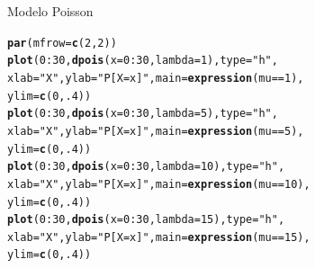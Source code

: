 \documentclass[10pt]{beamer}\usepackage[]{graphicx}\usepackage[]{color}
\makeatletter
\newcommand{\hlnum}[1]{\textcolor[rgb]{0.686,0.059,0.569}{#1}}%
\newcommand{\hlstr}[1]{\textcolor[rgb]{0.192,0.494,0.8}{#1}}%
\newcommand{\hlopt}[1]{\textcolor[rgb]{0,0,0}{#1}}%
\newcommand{\hlstd}[1]{\textcolor[rgb]{0.345,0.345,0.345}{#1}}%
\newcommand{\hlkwc}[1]{\textcolor[rgb]{0.333,0.667,0.333}{#1}}%
\newcommand{\hlkwd}[1]{\textcolor[rgb]{0.737,0.353,0.396}{\textbf{#1}}}%
\newenvironment{kframe}{%
 \def\at@end@of@kframe{}%
 \ifinner\ifhmode%
  \def\at@end@of@kframe{\end{minipage}}%
  \begin{minipage}{\columnwidth}%
 \fi\fi%
 \def\FrameCommand##1{\hskip\@totalleftmargin \hskip-\fboxsep
 \colorbox{shadecolor}{##1}\hskip-\fboxsep
     \hskip-\linewidth \hskip-\@totalleftmargin \hskip\columnwidth}%
 \MakeFramed {\advance\hsize-\width
   \@totalleftmargin\z@ \linewidth\hsize
   \@setminipage}}%
 {\par\unskip\endMakeFramed%
 \at@end@of@kframe}
\newenvironment{knitrout}{}{} %
\theoremstyle{definition}
\makeatother
\begin{document}
\begin{frame}[fragile]{Modelo Poisson}
\begin{knitrout}\small
{}\color{fgcolor}\begin{kframe}
\begin{alltt}
\hlkwd{par}\hlstd{(}\hlkwc{mfrow}\hlstd{=}\hlkwd{c}\hlstd{(}\hlnum{2}\hlstd{,}\hlnum{2}\hlstd{))}
\hlkwd{plot}\hlstd{(}\hlnum{0}\hlopt{:}\hlnum{30}\hlstd{,} \hlkwd{dpois}\hlstd{(}\hlkwc{x} \hlstd{=} \hlnum{0}\hlopt{:}\hlnum{30}\hlstd{,} \hlkwc{lambda} \hlstd{=} \hlnum{1}\hlstd{),} \hlkwc{type} \hlstd{=} \hlstr{"h"}\hlstd{,}
     \hlkwc{xlab} \hlstd{=} \hlstr{"X"}\hlstd{,} \hlkwc{ylab} \hlstd{=} \hlstr{"P[X = x]"}\hlstd{,} \hlkwc{main} \hlstd{=} \hlkwd{expression}\hlstd{(mu} \hlopt{==} \hlnum{1}\hlstd{),}
     \hlkwc{ylim} \hlstd{=} \hlkwd{c}\hlstd{(}\hlnum{0}\hlstd{,}\hlnum{.4}\hlstd{))}
\hlkwd{plot}\hlstd{(}\hlnum{0}\hlopt{:}\hlnum{30}\hlstd{,} \hlkwd{dpois}\hlstd{(}\hlkwc{x} \hlstd{=} \hlnum{0}\hlopt{:}\hlnum{30}\hlstd{,} \hlkwc{lambda} \hlstd{=} \hlnum{5}\hlstd{),} \hlkwc{type} \hlstd{=} \hlstr{"h"}\hlstd{,}
     \hlkwc{xlab} \hlstd{=} \hlstr{"X"}\hlstd{,} \hlkwc{ylab} \hlstd{=} \hlstr{"P[X = x]"}\hlstd{,} \hlkwc{main} \hlstd{=} \hlkwd{expression}\hlstd{(mu} \hlopt{==} \hlnum{5}\hlstd{),}
     \hlkwc{ylim} \hlstd{=} \hlkwd{c}\hlstd{(}\hlnum{0}\hlstd{,}\hlnum{.4}\hlstd{))}
\hlkwd{plot}\hlstd{(}\hlnum{0}\hlopt{:}\hlnum{30}\hlstd{,} \hlkwd{dpois}\hlstd{(}\hlkwc{x} \hlstd{=} \hlnum{0}\hlopt{:}\hlnum{30}\hlstd{,} \hlkwc{lambda} \hlstd{=} \hlnum{10}\hlstd{),} \hlkwc{type} \hlstd{=} \hlstr{"h"}\hlstd{,}
     \hlkwc{xlab} \hlstd{=} \hlstr{"X"}\hlstd{,} \hlkwc{ylab} \hlstd{=} \hlstr{"P[X = x]"}\hlstd{,} \hlkwc{main} \hlstd{=} \hlkwd{expression}\hlstd{(mu} \hlopt{==} \hlnum{10}\hlstd{),}
     \hlkwc{ylim} \hlstd{=} \hlkwd{c}\hlstd{(}\hlnum{0}\hlstd{,}\hlnum{.4}\hlstd{))}
\hlkwd{plot}\hlstd{(}\hlnum{0}\hlopt{:}\hlnum{30}\hlstd{,} \hlkwd{dpois}\hlstd{(}\hlkwc{x} \hlstd{=} \hlnum{0}\hlopt{:}\hlnum{30}\hlstd{,} \hlkwc{lambda} \hlstd{=} \hlnum{15}\hlstd{),} \hlkwc{type} \hlstd{=} \hlstr{"h"}\hlstd{,}
     \hlkwc{xlab} \hlstd{=} \hlstr{"X"}\hlstd{,} \hlkwc{ylab} \hlstd{=} \hlstr{"P[X = x]"}\hlstd{,} \hlkwc{main} \hlstd{=} \hlkwd{expression}\hlstd{(mu} \hlopt{==} \hlnum{15}\hlstd{),}
     \hlkwc{ylim} \hlstd{=} \hlkwd{c}\hlstd{(}\hlnum{0}\hlstd{,}\hlnum{.4}\hlstd{))}
\end{alltt}
\end{kframe}
\end{knitrout}
\end{frame}
\end{document}
